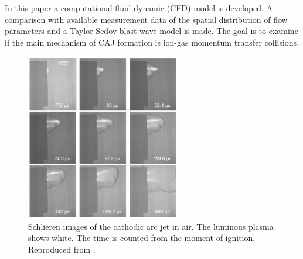 \documentclass[a4paper]{iacas}%
\begin{document}
In this paper a computational fluid dynamic (CFD) model is developed. A comparison with available measurement data of the spatial distribution of flow parameters and a Taylor-Sedov blast wave model \cite{TAYLOR,SEDOV} is made. The goal is to examine if the main mechanism of CAJ formation is ion-gas momentum transfer collisions.

\begin{figure}
	\centering
	\includegraphics[width=0.6\textwidth]{CAJ_highres.png}
	\caption{Schlieren images of the cathodic arc jet in air. The luminous plasma shows white. The time is counted from the moment of ignition. Reproduced from \cite{KR}.}
	\label{fig:CAJ}
\end{figure}
\end{document}
